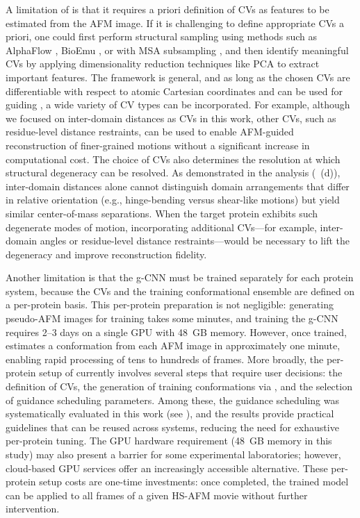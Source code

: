 A limitation of \Model is that it requires a priori definition of CVs as features to be estimated from the AFM image. If it is challenging to define appropriate CVs a priori, one could first perform structural sampling using methods such as AlphaFlow \cite{jing2024alphaflow}, BioEmu \cite{bioemu2025}, or \AFii with MSA subsampling \cite{delAlamo2022sampling}, and then identify meaningful CVs by applying dimensionality reduction techniques like PCA to extract important features. 
The \Model framework is general, and as long as the chosen CVs are differentiable with respect to atomic Cartesian coordinates and can be used for guiding \AFiii, a wide variety of CV types can be incorporated. For example, although we focused on inter-domain distances as CVs in this work, other CVs, such as residue-level distance restraints, can be used to enable AFM-guided reconstruction of finer-grained motions without a significant increase in computational cost.
The choice of CVs also determines the resolution at which structural degeneracy can be resolved.
As demonstrated in the \AK analysis (~(d)), inter-domain distances alone cannot distinguish domain arrangements that differ in relative orientation (e.g., hinge-bending versus shear-like motions) but yield similar center-of-mass separations.
When the target protein exhibits such degenerate modes of motion, incorporating additional CVs---for example, inter-domain angles or residue-level distance restraints---would be necessary to lift the degeneracy and improve reconstruction fidelity.

Another limitation is that the g-CNN must be trained separately for each protein system, because the CVs and the training conformational ensemble are defined on a per-protein basis.
This per-protein preparation is not negligible: generating pseudo-AFM images for training takes some minutes, and training the g-CNN requires 2--3 days on a single GPU with 48~GB memory.
However, once trained, \Model estimates a conformation from each AFM image in approximately one minute, enabling rapid processing of tens to hundreds of frames.
More broadly, the per-protein setup of \Model currently involves several steps that require user decisions: the definition of CVs, the generation of training conformations via \AFiii, and the selection of guidance scheduling parameters.
Among these, the guidance scheduling was systematically evaluated in this work (see ), and the results provide practical guidelines that can be reused across systems, reducing the need for exhaustive per-protein tuning.
The GPU hardware requirement (48~GB memory in this study) may also present a barrier for some experimental laboratories; however, cloud-based GPU services offer an increasingly accessible alternative.
These per-protein setup costs are one-time investments: once completed, the trained model can be applied to all frames of a given HS-AFM movie without further intervention.

